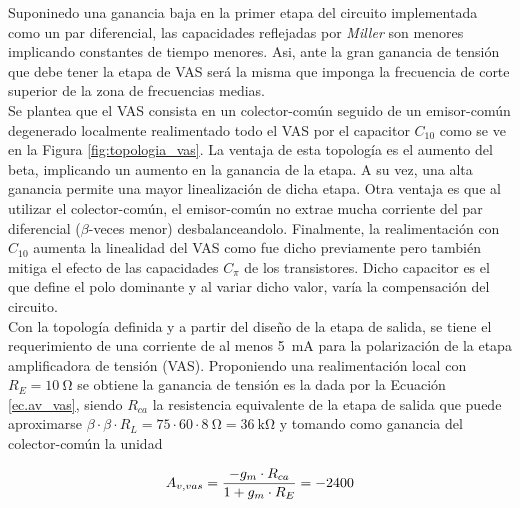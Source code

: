 	Suponinedo una ganancia baja en la primer etapa del circuito implementada como un par diferencial, las capacidades reflejadas por \emph{Miller} son menores implicando constantes de tiempo menores. Asi, ante la gran ganancia de tensión que debe tener la etapa de VAS será la misma que imponga la frecuencia de corte superior de la zona de frecuencias medias.\\
	\indent Se plantea que el VAS consista en un colector-común seguido de un emisor-común degenerado localmente realimentado todo el VAS por el capacitor $C_{10}$ como se ve en la Figura \ref{fig:topologia_vas}. La ventaja de esta topología es el aumento del beta, implicando un aumento en la ganancia de la etapa. A su vez, una alta ganancia permite una mayor linealización de dicha etapa. Otra ventaja es que al utilizar el colector-común, el emisor-común no extrae mucha corriente del par diferencial ($\beta$-veces menor) desbalanceandolo. Finalmente, la realimentación con $C_{10}$ aumenta la linealidad del VAS como fue dicho previamente pero también mitiga el efecto de las capacidades $C_{\pi}$ de los transistores. Dicho capacitor es el que define el polo dominante y al variar dicho valor, varía la compensación del circuito.\\

	Con la topología definida y a partir del diseño de la etapa de salida, se tiene el requerimiento de una corriente de al menos \SI{5}{\milli\ampere} para la polarización de la etapa amplificadora de tensión (VAS). Proponiendo una realimentación local con $R_E = \SI{10}{\ohm}$ se obtiene la ganancia de tensión es la dada por la Ecuación \eqref{ec.av_vas}, siendo $R_{ca}$ la resistencia equivalente de la etapa de salida que puede aproximarse $\beta \cdot \beta \cdot R_L = 75 \cdot 60 \cdot \SI{8}{\ohm} = \SI{36}{\kilo\ohm}$ y tomando como ganancia del colector-común la unidad

\begin{equation}
	\centering
	A_{v,vas} = \frac{-g_m \cdot R_{ca}}{1+g_m \cdot R_E} = -2400
	\label{ec.av_vas}
\end{equation}
	
